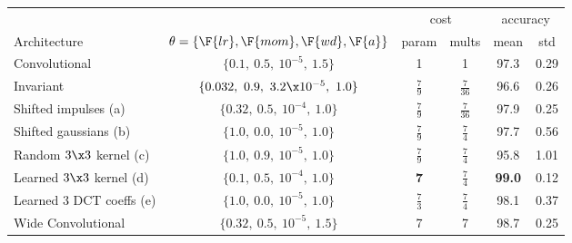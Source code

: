 \begin{table}[hbt]
  \renewcommand{\arraystretch}{1.4}
  \centering
  \label{tab:ch5:mnist_new_results}
  \begin{tabular}{@{}l c c c c c@{}}
    \toprule
    & & \multicolumn{2}{c}{cost} & \multicolumn{2}{c}{accuracy} \\\cline{3-4}\cline{5-6}
    Architecture & $\theta = \{\F{lr}, \F{mom}, \F{wd}, \F{a}\}$ & param & mults & mean & std  \\\midrule
    Convolutional & $\{0.1,\ 0.5,\ 10^{-5},\ 1.5 \}$ & 1 & 1 & 97.3 & 0.29 \\
    Invariant & $\{0.032,\ 0.9,\ 3.2\x 10^{-5},\ 1.0 \}$ & $\frac{7}{9}$ & $\frac{7}{36}$ & 96.6 & 0.26 \\\midrule
    Shifted impulses (a) & $\{0.32,\ 0.5,\ 10^{-4},\ 1.0 \}$ & $\frac{7}{9}$ & $\frac{7}{36}$ & 97.9 & 0.25 \\
    Shifted gaussians (b) & $\{1.0,\ 0.0,\ 10^{-5},\ 1.0 \}$ & $\frac{7}{9}$ & $\frac{7}{4}$ & 97.7 & 0.56\\
    Random $3\x3$ kernel (c) & $\{1.0,\ 0.9,\  10^{-5},\ 1.0 \}$ & $\frac{7}{9}$ & $\frac{7}{4}$ & 95.8 & 1.01\\
    Learned $3\x3$ kernel (d) & $\{0.1,\ 0.5,\  10^{-4},\ 1.0 \}$ & \textbf{7} & $\frac{7}{4}$ & \textbf{99.0} & 0.12 \\
    Learned 3 DCT coeffs (e) & $\{1.0,\ 0.0,\ 10^{-5},\ 1.0 \}$ & $\frac{7}{3}$ & $\frac{7}{4}$ & 98.1 & 0.37\\\midrule
    Wide Convolutional & $\{0.32,\ 0.5,\ 10^{-5},\ 1.5 \}$ & 7 & 7 & 98.7 & 0.25  \\
    \bottomrule
  \end{tabular}
\end{table}
